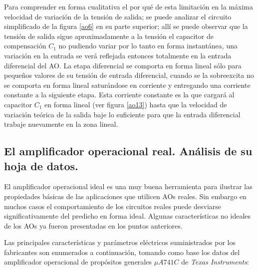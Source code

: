 Para comprender en forma cualitativa el por qué de esta limitación
en la máxima velocidad de variación de la tensión de salida; se
puede analizar el circuito simplificado de la figura \ref{ao6} en su
parte superior; allí se puede observar que la tensión de salida
sigue aproximadamente a la tensión el capacitor de compensación
$C_1$ no pudiendo variar por lo tanto en forma instantánea, una
variación en la entrada se verá reflejada entonces totalmente en la
entrada diferencial del AO. La etapa diferencial se comporta en
forma lineal sólo para pequeños valores de su tensión de entrada
diferencial, cuando se la sobreexcita no se comporta en forma lineal
saturándose en corriente y entregando una corriente constante a la
siguiente etapa. Esta corriente constante es la que cargará al
capacitor $C_1$ en forma lineal (ver figura \ref{ao13}) hasta que la
velocidad de variación teórica de la salida baje lo suficiente para
que la entrada diferencial trabaje nuevamente en la zona lineal.

\subsection{El amplificador operacional real. Análisis de su hoja de datos.}

\hspace{10pt} El amplificador operacional ideal es una muy buena herramienta para
ilustrar las propiedades básicas de las aplicaciones que utilicen
AOs reales. Sin embargo en muchos casos el comportamiento de los
circuitos reales puede desviarse significativamente del predicho en
forma ideal. Algunas características no ideales de los AOs ya fueron
presentadas en los puntos anteriores.

Las principales características y parámetros eléctricos
suministrados por los fabricantes son enumerados a continuación,
tomando como base los datos del amplificador operacional de
propósitos generales $\mu A 741C$ de \emph{Texas Instruments}:

